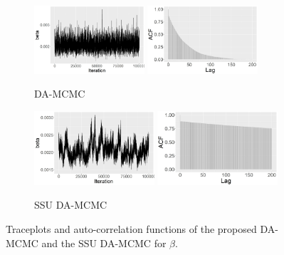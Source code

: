 \documentclass[11pt]{article}
\begin{document}
	\begin{figure}
		\centering
		\begin{subfigure}[b]{0.49\textwidth}
			\centering
			\includegraphics[width=0.45\textwidth]{E6_no_burn_beta_tp_joint.jpg}\quad
			\includegraphics[width=0.45\textwidth]{E6_burn_beta_acf_joint.jpg}
			\caption{DA-MCMC}
			\label{fig:E6_no_burn_beta_tp_joint}
		\end{subfigure}
		\hfill
		\begin{subfigure}[b]{0.49\textwidth}
			\centering
			\includegraphics[width=0.49\textwidth]{E6_no_burn_beta_tp_single.jpg}
			\includegraphics[width=0.49\textwidth]{E6_burn_beta_acf_single.jpg}
			\caption{SSU DA-MCMC}
			\label{fig:E6_no_burn_beta_tp_single}
		\end{subfigure}
		\caption{Traceplots and auto-correlation functions of the proposed DA-MCMC and the SSU DA-MCMC for $\beta$.}
		\label{fig:E6}
	\end{figure}
	
\end{document}
